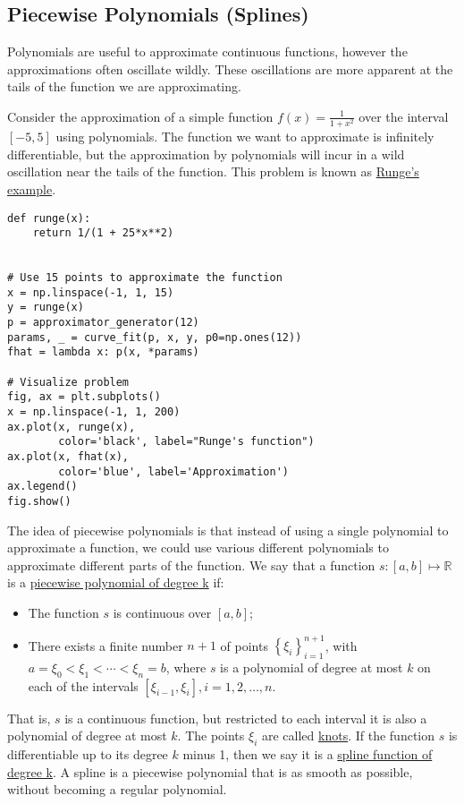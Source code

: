 \documentclass[12pt, a4paper]{article}
\newcommand{\Set}[1]{\left\{#1\right\}}
\begin{document}
\subsection{Piecewise Polynomials (Splines)}
\label{sec:org855ae92}
Polynomials are useful to approximate continuous functions, however the approximations often oscillate wildly.
These oscillations are more apparent at the tails of the function we are approximating.

Consider the approximation of a simple function \(f(x)=\frac{1}{1+x^2}\) over the interval \([-5, 5]\) using polynomials.
The function we want to approximate is infinitely differentiable, but the approximation by polynomials will incur in a wild oscillation near the tails of the function.
This problem is known as \href{https://en.wikipedia.org/wiki/Runge\%27s\_phenomenon}{Runge's example}.
\lstset{language=jupyter-python,label= ,caption= ,captionpos=b,numbers=none}
\begin{lstlisting}
def runge(x):
    return 1/(1 + 25*x**2)


# Use 15 points to approximate the function
x = np.linspace(-1, 1, 15)
y = runge(x)
p = approximator_generator(12)
params, _ = curve_fit(p, x, y, p0=np.ones(12))
fhat = lambda x: p(x, *params)

# Visualize problem
fig, ax = plt.subplots()
x = np.linspace(-1, 1, 200)
ax.plot(x, runge(x),
        color='black', label="Runge's function")
ax.plot(x, fhat(x),
        color='blue', label='Approximation')
ax.legend()
fig.show()
\end{lstlisting}

The idea of piecewise polynomials is that instead of using a single polynomial to approximate a function, we could use various different polynomials to approximate different parts of the function.
We say that a function \(s:[a,b]\mapsto\mathbb{R}\) is a \uline{piecewise polynomial of degree k} if:
\begin{itemize}
\item The function \(s\) is continuous over \([a,b]\);
\item There exists a finite number \(n+1\) of points \(\Set{\xi_i}_{i=1}^{n+1}\), with \(a=\xi_0<\xi_1<\cdots<\xi_n=b\), where \(s\) is a polynomial of degree at most \(k\) on each of the intervals \([\xi_{i-1}, \xi_i], i=1,2,\ldots,n\).
\end{itemize}
That is, \(s\) is a continuous function, but restricted to each interval it is also a polynomial of degree at most \(k\).
The points \(\xi_i\) are called \uline{knots}.
If the function \(s\) is differentiable up to its degree \(k\) minus 1, then we say it is a \uline{spline function of degree k}.
A spline is a piecewise polynomial that is as smooth as possible, without becoming a regular polynomial.
\end{document}
